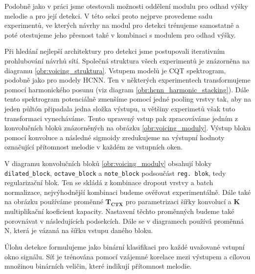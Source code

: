 Podobně jako v práci \cite{Rigaud2016} jsme otestovali možnosti oddělení modulu pro odhad výšky melodie a pro její detekci. V této sekci proto nejprve provedeme sadu experimentů, ve kterých návrhy na modul pro detekci trénujeme samostatně a poté otestujeme jeho přesnost také v kombinaci s modulem pro odhad výšky.

Při hledání nejlepší architektury pro detekci jsme postupovali iterativním prohlubování návrhů sítí. Společná struktura všech experimentů je znázorněna na diagramu \ref{obr:voicing_struktura}. Vstupem modelů je CQT spektrogram, podobně jako pro modely HCNN. Ten v některých experimentech transformujeme pomocí harmonického posunu (viz diagram \ref{obr:hcnn_harmonic_stacking}). Dále tento spektrogram potenciálně zmenšíme pomocí jedné pooling vrstvy tak, aby na jeden půltón připadala jedna složka výstupu, u většiny experimetů však tuto transformaci vynecháváme. Tento upravený vstup pak zpracováváme jedním z konvolučních bloků znázorněných na obrázku \ref{obr:voicing_moduly}. Výstup bloku pomocí konvoluce a následné sigmoidy zredukujeme na výstupní hodnoty označující přítomnost melodie v každém ze vstupních oken. 

V diagramu konvolučních bloků \ref{obr:voicing_moduly} obsahují bloky \texttt{dilated\_block}, \texttt{octave\_block} a \texttt{note\_block} podsoučást \texttt{reg. blok}, tedy regularizační blok. Ten se skládá z kombinace dropout vrstvy a batch normalizace, nejvýhodnější kombinaci budeme ověřovat experimentálně. Dále také na obrázku používáme proměnné $\mathbf{ T_{CTX}}$ pro parametrizaci šířky konvolucí a $\mathbf{K}$ multiplikační koeficient kapacity. Nastavení těchto proměnných budeme také porovnávat v následujících podsekcích. Dále se v diagramech používá proměnná N, která je vázaná na šířku vstupu daného bloku. 

Úlohu detekce formulujeme jako binární klasifikaci pro každé uvažované vstupní okno signálu. Síť je trénována pomocí vzájemné korelace mezi výstupem a cílovou množinou binárních veličin, které indikují přítomnost melodie.


